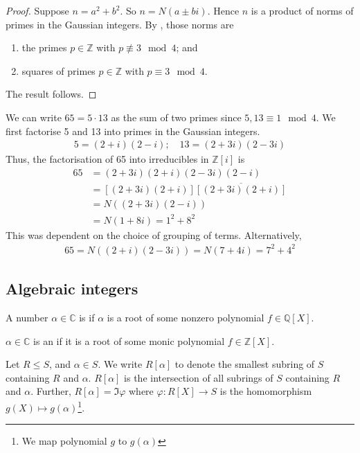 \begin{proof}
	Suppose $n = a^2 + b^2$.
	So $n = N(a \pm bi)$.
	Hence $n$ is a product of norms of primes in the Gaussian integers.
	By , those norms are
	\begin{enumerate}
		\item the primes $p \in \mathbb Z$ with $p \not\equiv 3 \mod 4$; and
		\item squares of primes $p \in \mathbb Z$ with $p \equiv 3 \mod 4$.
	\end{enumerate}
	The result follows.
\end{proof}
\begin{example}
	We can write $65 = 5 \cdot 13$ as the sum of two primes since $5, 13 \equiv 1 \mod 4$.
	We first factorise 5 and 13 into primes in the Gaussian integers.
	\begin{align*}
		5 = (2+i)(2-i);\quad 13 = (2+3i)(2-3i)
	\end{align*}
	Thus, the factorisation of 65 into irreducibles in $\mathbb Z[i]$ is
	\begin{align*}
		65 & = (2+3i)(2+i)(2-3i)(2-i)                \\
		   & = [(2+3i)(2+i)]\overline{[(2+3i)(2+i)]} \\
		   & = N((2+3i)(2-i))                        \\
		   & = N(1+8i) = 1^2 + 8^2
	\end{align*}
	This was dependent on the choice of grouping of terms.
	Alternatively,
	\begin{align*}
		65 = N((2+i)(2-3i)) = N(7+4i) = 7^2 + 4^2
	\end{align*}
\end{example}

\subsection{Algebraic integers}
\begin{definition}[Algebraic]
	A number $\alpha \in \mathbb C$ is  if $\alpha$ is a root of some nonzero polynomial $f \in \mathbb Q[X]$.
\end{definition}

\begin{definition}
	$\alpha \in \mathbb{C}$ is an  if it is a root of some monic polynomial $f \in \mathbb Z[X]$.
\end{definition} 

\begin{notation}
	Let $R \leq S$, and $\alpha \in S$.
	We write $R[\alpha]$ to denote the smallest subring of $S$ containing $R$ and $\alpha$.
	$R[\alpha]$ is the intersection of all subrings of $S$ containing $R$ and $\alpha$.
	Further, $R[\alpha] = \Im \varphi$ where $\varphi : R[X] \to S$ is the homomorphism $g(X) \mapsto g(\alpha)$\footnote{We map polynomial $g$ to $g(\alpha)$}.
\end{notation} 

